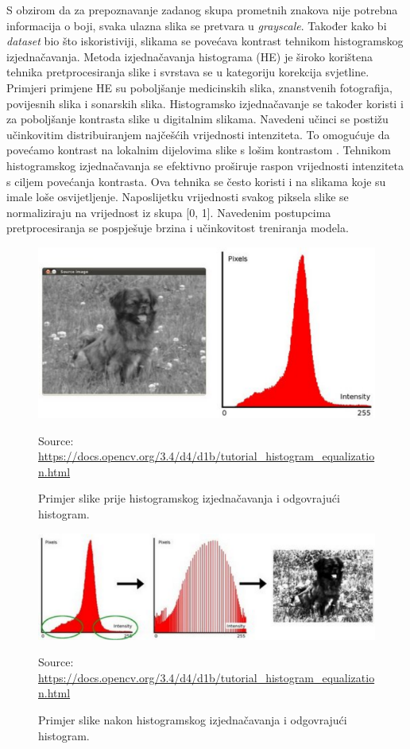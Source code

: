 \documentclass[times, utf8, zavrsni]{fer}
\newcommand{\source}[1]{\caption*{Source: {#1}} }
\begin{document}
S obzirom da za prepoznavanje zadanog skupa prometnih znakova nije potrebna informacija o boji, svaka ulazna slika se pretvara u \emph{grayscale}.
Također kako bi \emph{dataset} bio što iskoristiviji, slikama se povećava kontrast tehnikom histogramskog izjednačavanja. Metoda izjednačavanja histograma (HE) je široko korištena tehnika pretprocesiranja slike i svrstava se u kategoriju korekcija svjetline. 
Primjeri primjene HE su poboljšanje medicinskih slika, znanstvenih fotografija, povijesnih slika i sonarskih slika. Histogramsko izjednačavanje se također koristi i za poboljšanje kontrasta slike u digitalnim slikama. 
Navedeni učinci se postižu učinkovitim distribuiranjem najčešćih vrijednosti intenziteta. To omogućuje da povećamo kontrast na lokalnim dijelovima slike s lošim kontrastom \citep{9642082}.
Tehnikom histogramskog izjednačavanja se efektivno proširuje raspon vrijednosti intenziteta s ciljem povećanja kontrasta. Ova tehnika se često koristi i na slikama koje su imale loše osvijetljenje.
Naposlijetku vrijednosti svakog piksela slike se normaliziraju na vrijednost iz skupa [0, 1]. Navedenim postupcima pretprocesiranja se pospješuje brzina i učinkovitost treniranja modela.
\begin{figure}[h!]
  \includegraphics[width=\linewidth,trim=4 4 4 4,clip]{images/hist1.png}
  \caption{Primjer slike prije histogramskog izjednačavanja i odgovrajući histogram.}
  \source{\url{https://docs.opencv.org/3.4/d4/d1b/tutorial_histogram_equalization.html}}
\end{figure}
\begin{figure}[h!]
  \includegraphics[width=\linewidth,trim=4 4 4 4,clip]{images/hist2.png}
  \caption{Primjer slike nakon histogramskog izjednačavanja i odgovrajući histogram.}
  \source{\url{https://docs.opencv.org/3.4/d4/d1b/tutorial_histogram_equalization.html}}
\end{figure}
\pagebreak
\clearpage
\end{document}
